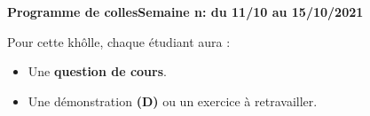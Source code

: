 \documentclass[twoside,a4paper,french,10pt]{VcCours}
\begin{document}

\begin{center}
\large\bf
Programme de collesSemaine n: du 11/10 au 15/10/2021
\end{center}
\separationTitre


Pour cette khôlle, chaque étudiant aura :
\begin{itemize}
\item Une \textbf{question de cours}.
\item Une démonstration \textbf{(D)} ou un exercice à retravailler.
\end{itemize}
\end{document}
